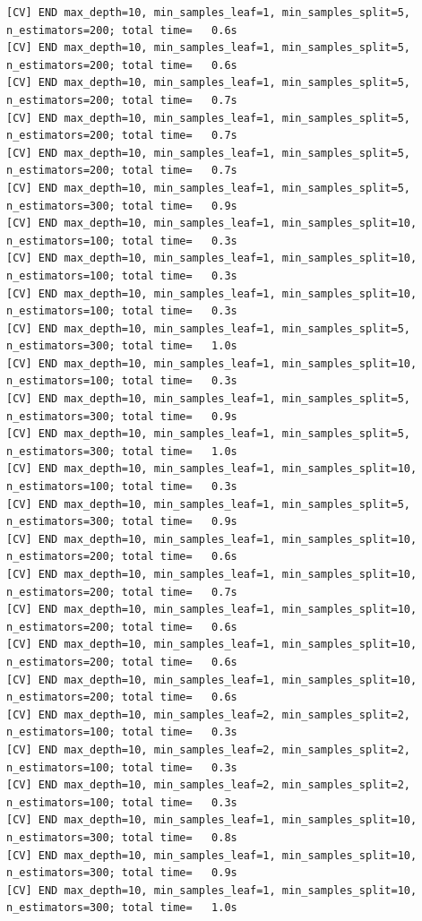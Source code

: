 \documentclass[
  11pt,
  letterpaper,
  DIV=11,
  numbers=noendperiod]{scrartcl}
\begin{document}
\begin{verbatim}
[CV] END max_depth=10, min_samples_leaf=1, min_samples_split=5, n_estimators=200; total time=   0.6s
[CV] END max_depth=10, min_samples_leaf=1, min_samples_split=5, n_estimators=200; total time=   0.6s
[CV] END max_depth=10, min_samples_leaf=1, min_samples_split=5, n_estimators=200; total time=   0.7s
[CV] END max_depth=10, min_samples_leaf=1, min_samples_split=5, n_estimators=200; total time=   0.7s
[CV] END max_depth=10, min_samples_leaf=1, min_samples_split=5, n_estimators=200; total time=   0.7s
[CV] END max_depth=10, min_samples_leaf=1, min_samples_split=5, n_estimators=300; total time=   0.9s
[CV] END max_depth=10, min_samples_leaf=1, min_samples_split=10, n_estimators=100; total time=   0.3s
[CV] END max_depth=10, min_samples_leaf=1, min_samples_split=10, n_estimators=100; total time=   0.3s
[CV] END max_depth=10, min_samples_leaf=1, min_samples_split=10, n_estimators=100; total time=   0.3s
[CV] END max_depth=10, min_samples_leaf=1, min_samples_split=5, n_estimators=300; total time=   1.0s
[CV] END max_depth=10, min_samples_leaf=1, min_samples_split=10, n_estimators=100; total time=   0.3s
[CV] END max_depth=10, min_samples_leaf=1, min_samples_split=5, n_estimators=300; total time=   0.9s
[CV] END max_depth=10, min_samples_leaf=1, min_samples_split=5, n_estimators=300; total time=   1.0s
[CV] END max_depth=10, min_samples_leaf=1, min_samples_split=10, n_estimators=100; total time=   0.3s
[CV] END max_depth=10, min_samples_leaf=1, min_samples_split=5, n_estimators=300; total time=   0.9s
[CV] END max_depth=10, min_samples_leaf=1, min_samples_split=10, n_estimators=200; total time=   0.6s
[CV] END max_depth=10, min_samples_leaf=1, min_samples_split=10, n_estimators=200; total time=   0.7s
[CV] END max_depth=10, min_samples_leaf=1, min_samples_split=10, n_estimators=200; total time=   0.6s
[CV] END max_depth=10, min_samples_leaf=1, min_samples_split=10, n_estimators=200; total time=   0.6s
[CV] END max_depth=10, min_samples_leaf=1, min_samples_split=10, n_estimators=200; total time=   0.6s
[CV] END max_depth=10, min_samples_leaf=2, min_samples_split=2, n_estimators=100; total time=   0.3s
[CV] END max_depth=10, min_samples_leaf=2, min_samples_split=2, n_estimators=100; total time=   0.3s
[CV] END max_depth=10, min_samples_leaf=2, min_samples_split=2, n_estimators=100; total time=   0.3s
[CV] END max_depth=10, min_samples_leaf=1, min_samples_split=10, n_estimators=300; total time=   0.8s
[CV] END max_depth=10, min_samples_leaf=1, min_samples_split=10, n_estimators=300; total time=   0.9s
[CV] END max_depth=10, min_samples_leaf=1, min_samples_split=10, n_estimators=300; total time=   1.0s

\end{verbatim}
\end{document}
